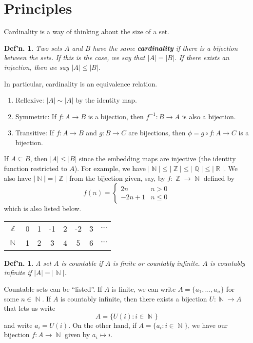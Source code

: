 \documentclass[12pt, a4paper]{book}
\DeclareMathOperator{\N}{\mathbb{N}}
\DeclareMathOperator{\Q}{\mathbb{Q}}
\DeclareMathOperator{\Z}{\mathbb{Z}}
\DeclareMathOperator{\R}{\mathbb{R}}
\newtheorem{definition}[theorem]{Def'n.}
\theoremstyle{nonumberplain}
\begin{document}
\section{Principles}
Cardinality is a way of thinking about the size of a set.
\begin{definition}
    Two sets $A$ and $B$ have the same \textbf{cardinality} if there is a bijection between the sets. If this is the case, we
    say that $|A|=|B|$. If there exists an injection, then we say $|A|\leq|B|$.
\end{definition}
In particular, cardinality is an equivalence relation.
\begin{enumerate}
    \item Reflexive: $|A|\sim|A|$ by the identity map.
    \item Symmetric: If $f:A\to B$ is a bijection, then $f^{-1}:B\to A$ is also a bijection.
    \item Transitive: If $f:A\to B$ and $g:B\to C$ are bijections, then $\phi=g\circ f:A\to C$ is a bijection.
\end{enumerate}
If $A\subseteq B$, then $|A|\leq|B|$ since the embedding maps are injective (the identity function restricted to $A$).
For example, we have $|\N|\leq|\Z|\leq|\Q|\leq|\R|$. We also have $|\N|=|\Z|$ from the bijection given, say, by $f:\Z\to\N$
defined by
\[f(n)=
\begin{cases}
    2n & n>0\\
    -2n+1 & n\leq 0
\end{cases}
\]
which is also listed below.
\begin{center}
    \begin{tabular}{cccccccc}
        $\Z$&0&1&-1&2&-2&3&$\cdots$\\
        $\N$&1&2&3 &4&5 &6&$\cdots$
    \end{tabular}
\end{center}
\begin{definition}
    A set $A$ is countable if $A$ is finite or countably infinite. $A$ is countably infinite if $|A|=|\N|$.
\end{definition}
Countable sets can be ``listed''. If $A$ is finite, we can write $A=\{a_1,\dots,a_n\}$ for some $n\in\N$. If $A$ is countably
infinite, then there exists a bijection $U:\N\to A$ that lets us write
\[A=\{U(i):i\in\N\}\]
and write $a_i=U(i)$. On the other hand, if $A=\{a_i:i\in\N\}$, we have our bijection $f:A\to\N$ given by $a_i\mapsto i$.
\end{document}
